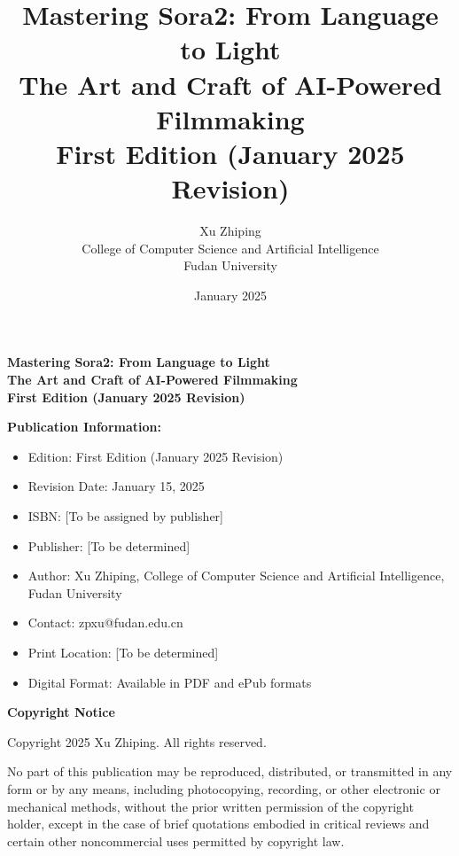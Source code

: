 \documentclass[11pt,letterpaper]{book}
\begin{document}
\frontmatter

\title{Mastering Sora2: From Language to Light\\
\large The Art and Craft of AI-Powered Filmmaking\\
\small First Edition (January 2025 Revision) }
\author{Xu Zhiping\\
\small College of Computer Science and Artificial Intelligence\\
\small Fudan University}
\date{January 2025}

\maketitle

\newpage
\thispagestyle{empty}
\vspace*{0.5cm}

\begin{center}
\textbf{Mastering Sora2: From Language to Light}\\
\textbf{The Art and Craft of AI-Powered Filmmaking}\\
\textbf{First Edition (January 2025 Revision)}
\end{center}

\vspace{1cm}

\textbf{Publication Information:}
\begin{itemize}
\item Edition: First Edition (January 2025 Revision)
\item Revision Date: January 15, 2025
\item ISBN: [To be assigned by publisher]
\item Publisher: [To be determined]
\item Author: Xu Zhiping, College of Computer Science and Artificial Intelligence, Fudan University
\item Contact: zpxu@fudan.edu.cn
\item Print Location: [To be determined]
\item Digital Format: Available in PDF and ePub formats
\end{itemize}

\vspace{0.5cm}

\textbf{Copyright Notice}

Copyright \textcopyright{} 2025 Xu Zhiping. All rights reserved.

No part of this publication may be reproduced, distributed, or transmitted in any form or by any means, including photocopying, recording, or other electronic or mechanical methods, without the prior written permission of the copyright holder, except in the case of brief quotations embodied in critical reviews and certain other noncommercial uses permitted by copyright law.
\end{document}
